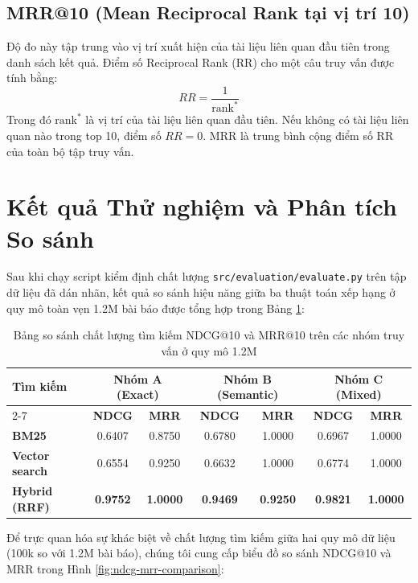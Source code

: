 \subsection{MRR@10 (Mean Reciprocal Rank tại vị trí 10)}
Độ đo này tập trung vào vị trí xuất hiện của tài liệu liên quan đầu tiên trong danh sách kết quả. Điểm số Reciprocal Rank (RR) cho một câu truy vấn được tính bằng:
\begin{equation}
RR = \frac{1}{\text{rank}^*}
\end{equation}
Trong đó $\text{rank}^*$ là vị trí của tài liệu liên quan đầu tiên. Nếu không có tài liệu liên quan nào trong top 10, điểm số $RR = 0$. MRR là trung bình cộng điểm số RR của toàn bộ tập truy vấn.

\section{Kết quả Thử nghiệm và Phân tích So sánh}
Sau khi chạy script kiểm định chất lượng \texttt{src/evaluation/evaluate.py} trên tập dữ liệu đã dán nhãn, kết quả so sánh hiệu năng giữa ba thuật toán xếp hạng ở quy mô toàn vẹn 1.2M bài báo được tổng hợp trong Bảng \ref{tab:eval-results}:

\begin{table}[H]
\centering
\begin{tabular}{|l|c|c|c|c|c|c|}
\hline
\multirow{2}{*}{\textbf{Tìm kiếm}} & \multicolumn{2}{c|}{\textbf{Nhóm A (Exact)}} & \multicolumn{2}{c|}{\textbf{Nhóm B (Semantic)}} & \multicolumn{2}{c|}{\textbf{Nhóm C (Mixed)}} \\
\cline{2-7}
& \textbf{NDCG} & \textbf{MRR} & \textbf{NDCG} & \textbf{MRR} & \textbf{NDCG} & \textbf{MRR} \\
\hline
\textbf{BM25} & 0.6407 & 0.8750 & 0.6780 & 1.0000 & 0.6967 & 1.0000 \\
\hline
\textbf{Vector search} & 0.6554 & 0.9250 & 0.6632 & 1.0000 & 0.6774 & 1.0000 \\
\hline
\textbf{Hybrid (RRF)} & \textbf{0.9752} & \textbf{1.0000} & \textbf{0.9469} & \textbf{0.9250} & \textbf{0.9821} & \textbf{1.0000} \\
\hline
\end{tabular}
\caption{Bảng so sánh chất lượng tìm kiếm NDCG@10 và MRR@10 trên các nhóm truy vấn ở quy mô 1.2M}
\label{tab:eval-results}
\end{table}

Để trực quan hóa sự khác biệt về chất lượng tìm kiếm giữa hai quy mô dữ liệu (100k so với 1.2M bài báo), chúng tôi cung cấp biểu đồ so sánh NDCG@10 và MRR trong Hình \ref{fig:ndcg-mrr-comparison}:

